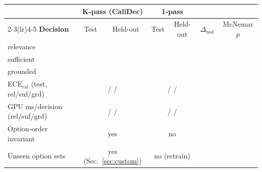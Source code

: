 \begin{tabular}{lcccccc}
\toprule
& \multicolumn{2}{c}{\textbf{K-pass (CaliDec)}} & \multicolumn{2}{c}{\textbf{1-pass}} & & \\
\cmidrule(lr){2-3}\cmidrule(lr){4-5}
\textbf{Decision} & Test & Held-out & Test & Held-out & $\Delta_{\text{test}}$ & McNemar $p$ \\
\midrule
relevance & \ph{--} & \ph{--} & \ph{--} & \ph{--} & \ph{--} & \ph{--} \\
sufficient & \ph{--} & \ph{--} & \ph{--} & \ph{--} & \ph{--} & \ph{--} \\
grounded & \ph{--} & \ph{--} & \ph{--} & \ph{--} & \ph{--} & \ph{--} \\
\midrule
ECE$_{\mathrm{cal}}$ (test, rel/suf/grd) & \multicolumn{2}{c}{\ph{--} / \ph{--} / \ph{--}} & \multicolumn{2}{c}{\ph{--} / \ph{--} / \ph{--}} & & \\
GPU ms/decision (rel/suf/grd) & \multicolumn{2}{c}{\ph{--} / \ph{--} / \ph{--}} & \multicolumn{2}{c}{\ph{--} / \ph{--} / \ph{--}} & & \\
Option-order invariant & \multicolumn{2}{c}{yes} & \multicolumn{2}{c}{no} & & \\
Unseen option sets & \multicolumn{2}{c}{yes (Sec.~\ref{sec:custom})} & \multicolumn{2}{c}{no (retrain)} & & \\
\bottomrule
\end{tabular}
